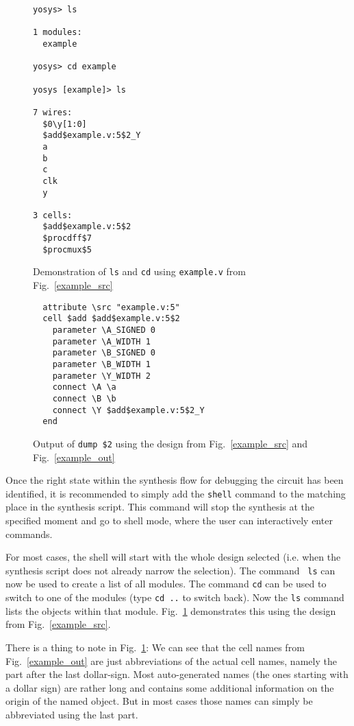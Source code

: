 \documentclass[9pt,technote,a4paper]{IEEEtran}
\begin{document}
\begin{figure}
\begin{lstlisting}
yosys> ls

1 modules:
  example

yosys> cd example 

yosys [example]> ls

7 wires:
  $0\y[1:0]
  $add$example.v:5$2_Y
  a
  b
  c
  clk
  y

3 cells:
  $add$example.v:5$2
  $procdff$7
  $procmux$5
\end{lstlisting}
\caption{Demonstration of {\tt ls} and {\tt cd} using {\tt example.v} from Fig.~\ref{example_src}}
\label{lscd}
\end{figure}

\begin{figure}[b]
\begin{lstlisting}
  attribute \src "example.v:5"
  cell $add $add$example.v:5$2
    parameter \A_SIGNED 0
    parameter \A_WIDTH 1
    parameter \B_SIGNED 0
    parameter \B_WIDTH 1
    parameter \Y_WIDTH 2
    connect \A \a
    connect \B \b
    connect \Y $add$example.v:5$2_Y
  end
\end{lstlisting}
\caption{Output of {\tt dump \$2} using the design from Fig.~\ref{example_src} and  Fig.~\ref{example_out}}
\label{dump2}
\end{figure}

Once the right state within the synthesis flow for debugging the circuit has
been identified, it is recommended to simply add the {\tt shell} command
to the matching place in the synthesis script. This command will stop the
synthesis at the specified moment and go to shell mode, where the user can
interactively enter commands.

For most cases, the shell will start with the whole design selected (i.e.  when
the synthesis script does not already narrow the selection). The command {\tt
ls} can now be used to create a list of all modules. The command {\tt cd} can
be used to switch to one of the modules (type {\tt cd ..} to switch back). Now
the {\tt ls} command lists the objects within that module. Fig.~\ref{lscd}
demonstrates this using the design from Fig.~\ref{example_src}.

There is a thing to note in Fig.~\ref{lscd}: We can see that the cell names
from Fig.~\ref{example_out} are just abbreviations of the actual cell names,
namely the part after the last dollar-sign. Most auto-generated names (the ones
starting with a dollar sign) are rather long and contains some additional
information on the origin of the named object. But in most cases those names
can simply be abbreviated using the last part.
\end{document}
